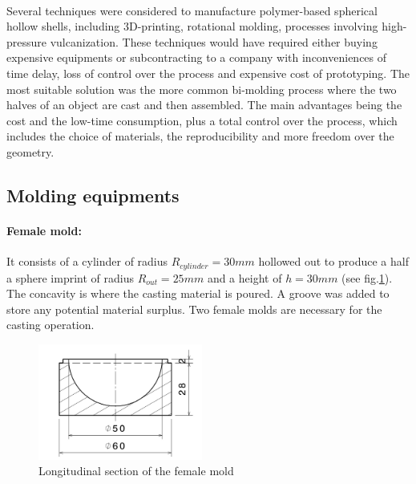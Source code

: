 \paragraph{}
Several techniques were considered to manufacture polymer-based spherical hollow shells, including 3D-printing, rotational molding, processes involving high-pressure vulcanization. These techniques would have required either buying expensive equipments or subcontracting to a company with inconveniences of time delay, loss of control over the process and expensive cost of prototyping. 
The most suitable solution was the more common bi-molding process where the two halves of an object are cast and then assembled. The main advantages being the cost and the low-time consumption, plus a total control over the process, which includes the choice of materials, the reproducibility and more freedom over the geometry.
\subsection{Molding equipments}

\paragraph{\textbf{Female mold:}}
It consists of a cylinder of radius $R_{cylinder}=30 mm$  hollowed out to produce a half a sphere imprint of radius $R_{out}=25 mm$ and a height of $h = 30 mm$ (see fig.\ref{fig:female_mold}). The concavity is where the casting material is poured.
A groove was added to store any potential material surplus. Two female molds are necessary for the casting operation.
\begin{figure}[h] %
	\centering%
		\includegraphics[width=0.48\textwidth]{figures/Chapter_1/female_mold.jpg}%
		\caption{Longitudinal section of the female mold}%
		\label{fig:female_mold}%
\end{figure}


